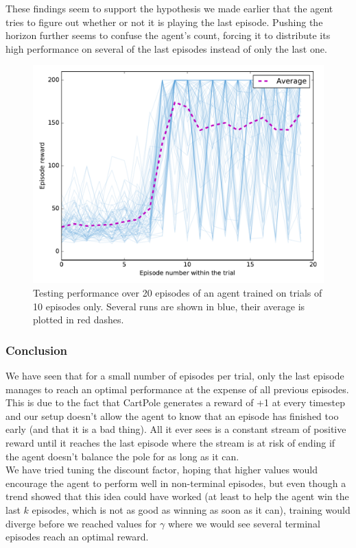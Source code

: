 These findings seem to support the hypothesis we made earlier that the agent
tries to figure out whether or not it is playing the last episode. Pushing
the horizon further seems to confuse the agent's count, forcing it 
to distribute its high performance on several of the last episodes instead
of only the last one.\\

\begin{figure}
	\centering
	\includegraphics[width=0.8\linewidth]{fig/horizon_10_3perms.pdf}
	\caption{Testing performance over 20 episodes of an agent trained on 
	trials of 10 episodes only. 
	Several runs are shown in blue, their average is plotted in red dashes.}
	\label{fig:horizon_10_3perms}
\end{figure}


\subsubsection{Conclusion}
We have seen that for a small number of episodes per trial, only the last
episode manages to reach an optimal performance at the expense of all 
previous episodes. This is due to the fact that CartPole generates a reward
of +1 at every timestep and our setup doesn't allow the agent to 
know that an episode has finished too early (and that it is a bad thing).
All it ever sees is a constant stream of positive reward until it reaches
the last episode where the stream is at risk of ending if the agent doesn't
balance the pole for as long as it can.\\

We have tried tuning the discount factor, hoping that higher values would
encourage the agent to perform well in non-terminal episodes, but 
even though a trend showed that this idea could have worked (at least 
to help the agent win the last $k$ episodes, which is not as good as winning
as soon as it can), training would diverge before we reached values for $\gamma$
where we would see several terminal episodes reach an optimal reward.\\

